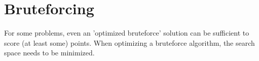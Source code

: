 \section{Bruteforcing}

For some problems, even an 'optimized bruteforce' solution can be sufficient to score (at least some) points.
When optimizing a bruteforce algorithm, the search space needs to be minimized.




